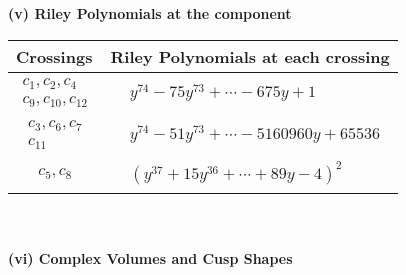\documentclass[1p]{elsarticle_modified}
\theoremstyle{definition}
\begin{document}
\newpage\renewcommand{\arraystretch}{1}
\flushleft \textbf{(v) Riley Polynomials at the component}\newline \\
\begin{tabular}{m{50pt}|m{274pt}}
Crossings & \hspace{64pt}Riley Polynomials at each crossing \\
\hline $$\begin{aligned}c_{1},c_{2},c_{4}\\c_{9},c_{10},c_{12}\end{aligned}$$&$\begin{aligned}
&y^{74}-75 y^{73}+\cdots-675 y+1
\end{aligned}$\\
\hline $$\begin{aligned}c_{3},c_{6},c_{7}\\c_{11}\end{aligned}$$&$\begin{aligned}
&y^{74}-51 y^{73}+\cdots-5160960 y+65536
\end{aligned}$\\
\hline $$\begin{aligned}c_{5},c_{8}\end{aligned}$$&$\begin{aligned}
&(y^{37}+15 y^{36}+\cdots+89 y-4)^{2}
\end{aligned}$\\
\hline
\end{tabular}\\~\\
\newpage\flushleft \textbf{(vi) Complex Volumes and Cusp Shapes}
\end{document}
